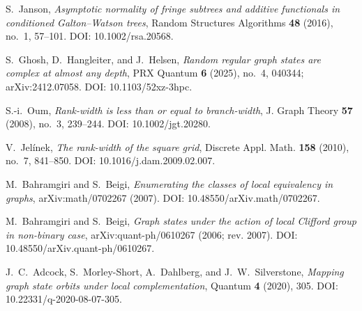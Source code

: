  S.~Janson,
\emph{Asymptotic normality of fringe subtrees and additive functionals in
conditioned Galton--Watson trees}, Random Structures Algorithms \textbf{48}
(2016), no.~1, 57--101. DOI: 10.1002/rsa.20568.

 S.~Ghosh, D.~Hangleiter, and J.~Helsen,
\emph{Random regular graph states are complex at almost any depth},
PRX Quantum \textbf{6} (2025), no.~4, 040344; arXiv:2412.07058.
DOI: 10.1103/52xz-3hpc.

 S.-i.~Oum,
\emph{Rank-width is less than or equal to branch-width},
J. Graph Theory \textbf{57} (2008), no.~3, 239--244.
DOI: 10.1002/jgt.20280.

 V.~Jel\'inek, \emph{The rank-width of the square grid},
Discrete Appl. Math. \textbf{158} (2010), no.~7, 841--850.
DOI: 10.1016/j.dam.2009.02.007.

 M.~Bahramgiri and S.~Beigi,
\emph{Enumerating the classes of local equivalency in graphs},
arXiv:math/0702267 (2007). DOI: 10.48550/arXiv.math/0702267.

 M.~Bahramgiri and S.~Beigi,
\emph{Graph states under the action of local Clifford group in non-binary
case}, arXiv:quant-ph/0610267 (2006; rev. 2007).
DOI: 10.48550/arXiv.quant-ph/0610267.

 J.~C.~Adcock, S.~Morley-Short, A.~Dahlberg, and
J.~W.~Silverstone, \emph{Mapping graph state orbits under local
complementation}, Quantum \textbf{4} (2020), 305.
DOI: 10.22331/q-2020-08-07-305.
